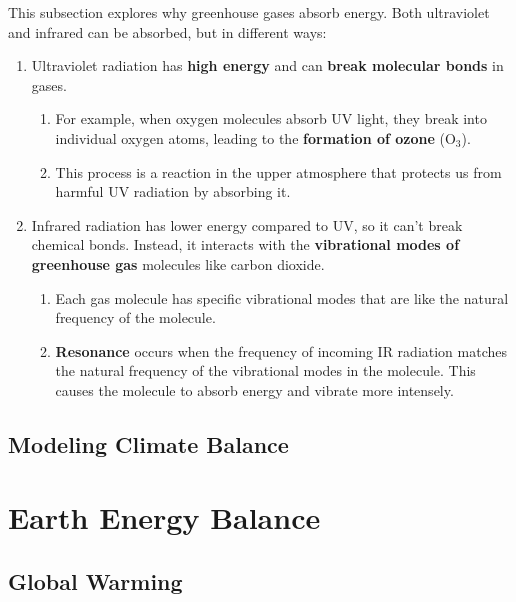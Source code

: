 \documentclass[a4paper,12pt]{article}
\let\oldsection\section
\renewcommand\section{\clearpage\oldsection}
\begin{document}
This subsection explores why greenhouse gases absorb energy. Both ultraviolet and infrared can be absorbed, but in different ways:
\begin{enumerate}
  \item Ultraviolet radiation has \textbf{high energy} and can \textbf{break molecular bonds} in gases.
        \begin{enumerate}
          \item For example, when oxygen molecules absorb UV light, they break into individual oxygen atoms, leading to the \textbf{formation of ozone} (O$_3$).
          \item This process is a reaction in the upper atmosphere that protects us from harmful UV radiation by absorbing it.
        \end{enumerate}
  \item Infrared radiation has lower energy compared to UV, so it can't break chemical bonds. Instead, it interacts with the \textbf{vibrational modes of greenhouse gas} molecules like carbon dioxide.
        \begin{enumerate}
          \item Each gas molecule has specific vibrational modes that are like the natural frequency of the molecule.
          \item \textbf{Resonance} occurs when the frequency of incoming IR radiation matches the natural frequency of the vibrational modes in the molecule. This causes the molecule to absorb energy and vibrate more intensely.
        \end{enumerate}
\end{enumerate}

\subsection{Modeling Climate Balance}

\section{Earth Energy Balance}

\subsection{Global Warming}
\end{document}
